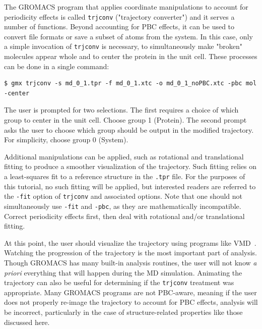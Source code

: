 \documentclass[9pt,tutorial,pubversion]{livecoms}
\begin{document}
The GROMACS program that applies coordinate manipulations to account for periodicity effects is called \texttt{trjconv} ("trajectory converter") and it serves a number of functions. Beyond accounting for PBC effects, it can be used to convert file formats or save a subset of atoms from the system. In this case, only a simple invocation of \texttt{trjconv} is necessary, to simultaneously make "broken" molecules appear whole and to center the protein in the unit cell. These processes can be done in a single command:

\begin{lstlisting}
$ gmx trjconv -s md_0_1.tpr -f md_0_1.xtc -o md_0_1_noPBC.xtc -pbc mol -center
\end{lstlisting}
%
The user is prompted for two selections. The first requires a choice of which group to center in the unit cell. Choose group 1 (Protein). The second prompt asks the user to choose which group should be output in the modified trajectory. For simplicity, choose group 0 (System).

Additional manipulations can be applied, such as rotational and translational fitting to produce a smoother visualization of the trajectory. Such fitting relies on a least-squares fit to a reference structure in the \texttt{.tpr} file. For the purposes of this tutorial, no such fitting will be applied, but interested readers are referred to the \texttt{-fit} option of \texttt{trjconv} and associated options. Note that one should not simultaneously use \texttt{-fit} and \texttt{-pbc}, as they are mathematically incompatible. Correct periodicity effects first, then deal with rotational and/or translational fitting.

At this point, the user should visualize the trajectory using programs like VMD~\cite{Humphrey1996}. Watching the progression of the trajectory is the most important part of analysis. Though GROMACS has many built-in analysis routines, the user will not know {\em a priori} everything that will happen during the MD simulation. Animating the trajectory can also be useful for determining if the \texttt{trjconv} treatment was appropriate. Many GROMACS programs are not PBC-aware, meaning if the user does not properly re-image the trajectory to account for PBC effects, analysis will be incorrect, particularly in the case of structure-related properties like those discussed here.
\end{document}
